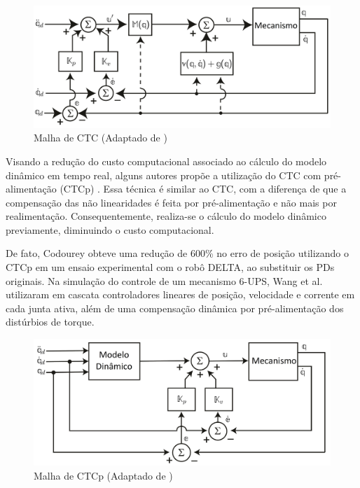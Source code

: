 \documentclass[]{politex}
\begin{document}
\begin{figure}[h]
	\centering
	\includegraphics[scale=0.385]{../figures/CTC.jpg}  
	\caption{Malha de CTC (Adaptado de \cite{Craig})}
	\label{fig:CTC}
\end{figure}

Visando a redução do custo computacional associado ao cálculo do modelo dinâmico em tempo real, alguns autores propõe a utilização do CTC com pré-alimentação (CTCp) \cite{Khalil, Siciliano, Spong}. Essa técnica é similar ao CTC, com a diferença de que a compensação das não linearidades é feita por pré-alimentação e não mais por realimentação.  Consequentemente, realiza-se o cálculo do modelo dinâmico previamente, diminuindo o custo computacional.

De fato, Codourey \cite{Codourey} obteve uma redução de 600\% no erro de posição utilizando o CTCp em um ensaio experimental com o robô DELTA, ao substituir os PDs originais. Na simulação do controle de um mecanismo 6-UPS, Wang et al. \cite{Wang} utilizaram em cascata controladores lineares de posição, velocidade e corrente em cada junta ativa, além de  uma compensação dinâmica por pré-alimentação dos distúrbios de torque.

\begin{figure}[h]
	\centering
	\includegraphics[scale=0.385]{../figures/CTCp.jpg}  
	\caption{Malha de CTCp (Adaptado de \cite{Craig})}
	\label{fig:CTCp}
\end{figure}
\end{document}
